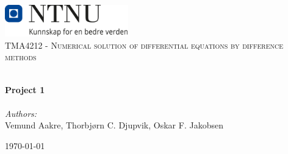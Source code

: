 
\begin{titlepage}
\vbox{ }
\vbox{ }
\begin{center}
\includegraphics[width=0.40\textwidth]{Images/NTNU_logo.png}\\[1cm]
\textsc{\Large TMA4212 - Numerical solution of differential equations by difference methods}\\[0.5cm]
\vbox{ }

\HRule \\[0.4cm]
{ \huge \bfseries Project 1}\\[0.4cm]
\HRule \\[1.5cm]

\large
\emph{Authors:}\\
Vemund Aakre, Thorbjørn C. Djupvik, Oskar F. Jakobsen
\vfill

{\large \today}
\end{center}
\end{titlepage}
